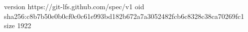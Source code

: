 version https://git-lfs.github.com/spec/v1
oid sha256:c8b7b50e0b0cf0c0c61e993bd182b672a7a3052482fcb6c8328c38ca70269fc1
size 1922
